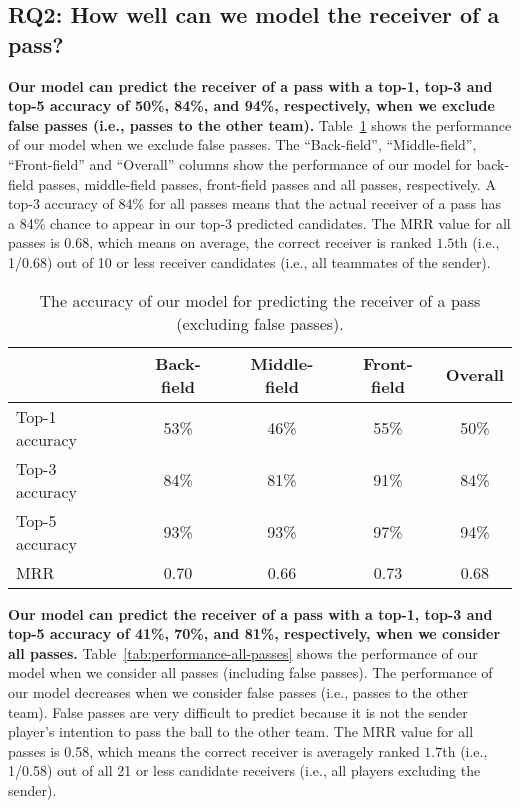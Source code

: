 \subsection{RQ2: How well can we model the receiver of a pass?}\label{RQ2-results}

\textbf{Our model can predict the receiver of a pass with a top-1, top-3 and top-5 accuracy of 50\%, 84\%, and 94\%, respectively, when we exclude false passes (i.e., passes to the other team).}
Table~\ref{tab:performance-accurate-passes} shows the performance of our model when we exclude false passes. 
The ``Back-field'', ``Middle-field'', ``Front-field'' and ``Overall'' columns show the performance of our model for back-field passes, middle-field passes, front-field passes and all passes, respectively. 
A top-3 accuracy of 84\% for all passes means that the actual receiver of a pass has a 84\% chance to appear in our top-3 predicted candidates.
The MRR value for all passes is 0.68, which means on average, the correct receiver is ranked $1.5$th (i.e., 1/0.68) out of 10 or less receiver candidates (i.e., all teammates of the sender).


\begin{table}[!t]
\caption{The accuracy of our model for predicting the receiver of a pass (excluding false passes).}
\centering
\begin{tabular}{lcccc}
  \hline
  & Back-field & Middle-field & Front-field & Overall \\
  \hline
  Top-1 accuracy & 53\% & 46\% & 55\% & 50\% \\
  Top-3 accuracy & 84\% & 81\% & 91\% & 84\% \\
  Top-5 accuracy & 93\% & 93\% & 97\% & 94\% \\
  MRR & 0.70 & 0.66 & 0.73 & 0.68 \\
  \hline
\end{tabular}
\label{tab:performance-accurate-passes}
\vspace{-0.4cm}
\end{table}

\textbf{Our model can predict the receiver of a pass with a top-1, top-3 and top-5 accuracy of 41\%, 70\%, and 81\%, respectively, when we consider all passes.}
Table~\ref{tab:performance-all-passes} shows the performance of our model when we consider all passes (including false passes). 
The performance of our model decreases when we consider false passes (i.e., passes to the other team). 
False passes are very difficult to predict because it is not the sender player's intention to pass the ball to the other team. 
The MRR value for all passes is 0.58, which means the correct receiver is averagely ranked $1.7$th (i.e., 1/0.58) out of all 21 or less candidate receivers (i.e., all players excluding the sender).

